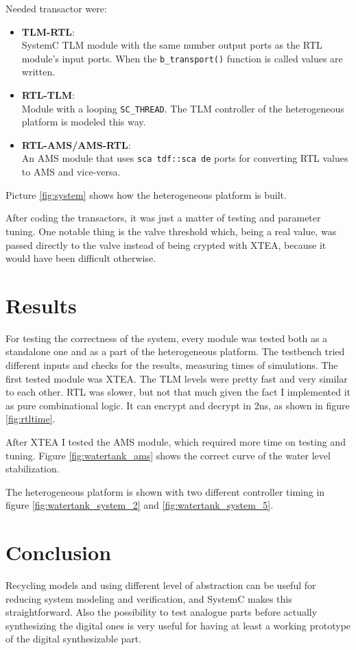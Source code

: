 \documentclass[]{IEEEtran}
\begin{document}
Needed transactor were:
\begin{itemize}
    \item \textbf{TLM-RTL}:\\
    SystemC TLM module with the same number output ports as the RTL module's input ports.
    When the \texttt{b\_transport()} function is called values are written.
    \item \textbf{RTL-TLM}:\\
    Module with a looping \texttt{SC\_THREAD}. The TLM controller of the heterogeneous platform is modeled this way.
    \item \textbf{RTL-AMS/AMS-RTL}:\\
    An AMS module that uses \texttt{sca tdf::sca de} ports for converting RTL values to AMS and vice-versa.
\end{itemize}

Picture \ref{fig:system} shows how the heterogeneous platform is built.

After coding the transactors, it was just a matter of testing and parameter tuning.
One notable thing is the valve threshold which, being a real value, was passed directly to the valve instead of being crypted with XTEA,
because it would have been difficult otherwise.

\section{Results}
For testing the correctness of the system, every module was tested both as a standalone one and as a part of the heterogeneous platform.
The testbench tried different inputs and checks for the results, measuring times of simulations.
The first tested module was XTEA. The TLM levels were pretty fast and very similar to each other. RTL was slower, but not that much given
the fact I implemented it as pure combinational logic. It can encrypt and decrypt in 2ns, as shown in figure \ref{fig:rtltime}.

After XTEA I tested the AMS module, which required more time on testing and tuning. Figure \ref{fig:watertank_ams} shows the correct
curve of the water level stabilization.

The heterogeneous platform is shown with two different controller timing in figure \ref{fig:watertank_system_2} and \ref{fig:watertank_system_5}.

\section{Conclusion}
Recycling models and using different level of abstraction can be useful for reducing system modeling and verification, and SystemC makes
this straightforward. Also the possibility to test analogue parts before actually synthesizing the digital ones is very useful for having
at least a working prototype of the digital synthesizable part.
\end{document}
